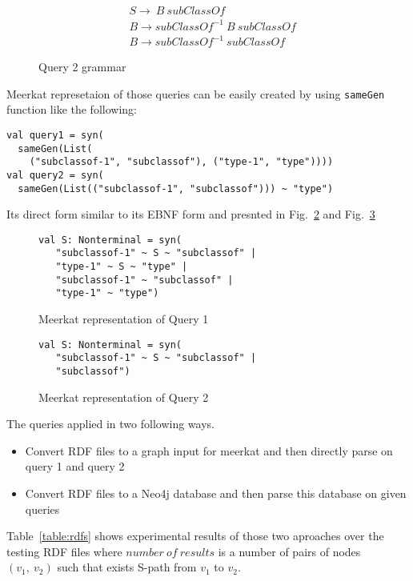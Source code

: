 \begin{figure}[h]
\begin{align*}
& S \rightarrow\ B\ subClassOf\\
& B \rightarrow subClassOf^{-1}\ B\ subClassOf\\
& B \rightarrow subClassOf^{-1}\ subClassOf
\end{align*}
\caption{Query 2 grammar}
\label{fig:query2}
\end{figure}

Meerkat represetaion of those queries can be easily created by using \lstinline{sameGen} function like the following:
\begin{lstlisting}
val query1 = syn(
  sameGen(List(
    ("subclassof-1", "subclassof"), ("type-1", "type"))))
val query2 = syn(
  sameGen(List(("subclassof-1", "subclassof"))) ~ "type")
\end{lstlisting}
 Its direct form similar to its EBNF form and presnted in Fig.~\ref{fig:query1Meerkat} and Fig.~\ref{fig:query2Meerkat}

\begin{figure}[h]
\begin{lstlisting}
val S: Nonterminal = syn(
   "subclassof-1" ~ S ~ "subclassof" |
   "type-1" ~ S ~ "type" |
   "subclassof-1" ~ "subclassof" |
   "type-1" ~ "type")
\end{lstlisting}
\caption{Meerkat representation of Query 1}
\label{fig:query1Meerkat}
\end{figure}

\begin{figure}[h]
\begin{lstlisting}
val S: Nonterminal = syn(
   "subclassof-1" ~ S ~ "subclassof" |
   "subclassof")
\end{lstlisting}
\caption{Meerkat representation of Query 2}
\label{fig:query2Meerkat}
\end{figure}

The queries applied in two following ways.
\begin{itemize}
    \item Convert RDF files to a graph input for meerkat and then directly parse on query 1 and query 2
    \item Convert RDF files to a Neo4j database and then parse this database on given queries
\end{itemize} 

Table~\ref{table:rdfs} shows experimental results of those two aproaches over the testing RDF files where $number\ of\ results$ is a number of pairs of nodes $(v_1,\ v_2)$ such that exists S-path from $v_1$ to $v_2$.

